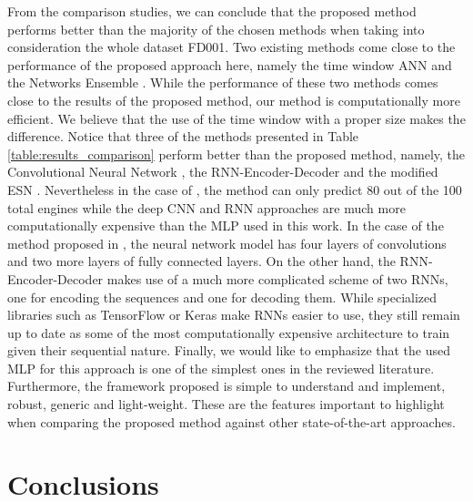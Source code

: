 \documentclass[preprint,12pt]{elsarticle}%
\begin{document}
From the comparison studies, we can conclude that the proposed method performs better than the majority of the chosen methods when taking into consideration the whole dataset FD001. Two existing methods come close to the performance of the proposed approach here, namely the time window ANN \cite{Lim2016} and the Networks Ensemble \cite{Zhang2016}.
While the performance of these two methods comes close to the results of the proposed method, our method is computationally more efficient. We believe that the use of the time window  with a proper size makes the difference. Notice that three of the methods presented in Table \ref{table:results_comparison} perform better than the proposed method, namely, the Convolutional Neural Network \cite{Li2018}, the RNN-Encoder-Decoder \cite{Malhorta2016} and the modified ESN \cite{Peng2012}. Nevertheless in the case of \cite{Peng2012}, the method can only predict 80 out of the 100 total engines while the deep CNN \cite{Li2018} and RNN \cite{Malhorta2016} approaches are much more computationally expensive than the MLP used in this work. In the case of the method proposed in \cite{Li2018}, the neural network model has four layers of convolutions and two more layers of fully connected layers. On the other hand, the RNN-Encoder-Decoder \cite{Malhorta2016} makes use of a much more complicated scheme of two RNNs, one for encoding the sequences and one for decoding them. While specialized libraries such as TensorFlow or Keras make RNNs easier to use, they still remain up to date as some of the most computationally expensive architecture to train given their sequential nature. Finally, we would like to emphasize that the used MLP for this approach is one of the simplest ones in the reviewed literature. Furthermore, the framework proposed is simple to understand and implement, robust, generic and light-weight. These are the features important to highlight when comparing the proposed method against other state-of-the-art approaches.

\section{Conclusions}

\label{sec:conclusions}
\end{document}
